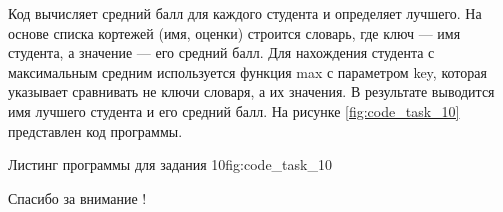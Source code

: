 \documentclass[]{vvsu}
\begin{document}
 Код вычисляет средний балл для каждого студента и определяет лучшего. На основе списка кортежей (имя, оценки) строится словарь, где ключ — имя студента, а значение — его средний балл. Для нахождения студента с максимальным средним используется функция max с параметром key, которая указывает сравнивать не ключи словаря, а их значения. В результате выводится имя лучшего студента и его средний балл. На рисунке \ref{fig:code_task_10} представлен код программы.

\begin{vvsu_figure}{Листинг программы для задания 10}{fig:code_task_10}
  \begin{minipage}{.75\textwidth}
    
  \end{minipage}
\end{vvsu_figure}

Спасибо за внимание !
\end{document}
